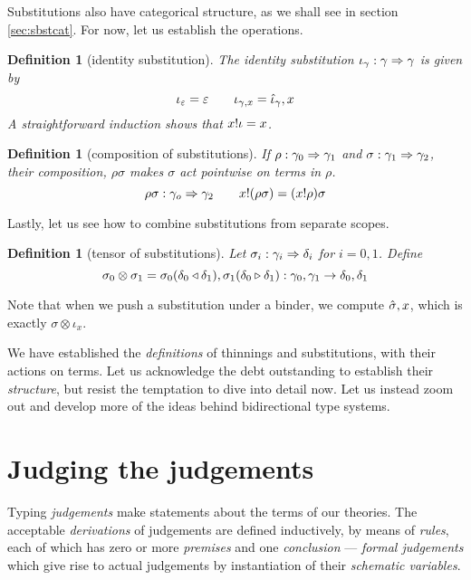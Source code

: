 \documentclass{jfp1}
\newtheorem{definition}[theorem]{Definition}
\newcommand{\emp}{\varepsilon}
\begin{document}
Substitutions also have categorical structure, as we shall see in
section \ref{sec:sbstcat}. For now, let us establish the operations.

\newcommand{\isu}{\iota}
\begin{definition}[identity substitution]
  The identity substitution $\isu_\gamma : \gamma\su\gamma$ is given by
  \[\isu_\emp = \emp \qquad \isu_{\gamma,x} = \wka\isu_\gamma,x
  \]
  A straightforward induction shows that $\sel x\isu = x$.
\end{definition}

\begin{definition}[composition of substitutions]
  If $\rho : \gamma_0\Rightarrow\gamma_1$ and $\sigma : \gamma_1\Rightarrow\gamma_2$, their
  composition, $\rho\sigma$ makes $\sigma$ act \emph{pointwise} on terms in $\rho$.
  \[\rho\sigma : \gamma_o\Rightarrow\gamma_2\qquad x!(\rho\sigma) =
    (x!\rho)\sigma
  \]
\end{definition}

Lastly, let us see how to combine substitutions from separate scopes.

\begin{definition}[tensor of substitutions]
  Let $\sigma_i : \gamma_i\Rightarrow\delta_i$ for $i=0,1$. Define
  \[
    \sigma_0\otimes\sigma_1 =
    \sigma_0(\delta_0 \triangleleft \delta_1),\sigma_1(\delta_0 \triangleright \delta_1)
    : \gamma_0,\gamma_1 \to \delta_0,\delta_1
  \]
\end{definition}

Note that when we push a substitution under a binder, we compute
$\hat\sigma,x$, which is exactly $\sigma\otimes\isu_x$.

We have established the \emph{definitions} of thinnings and
substitutions, with their actions on terms. Let us acknowledge the
debt outstanding to establish their \emph{structure}, but resist the
temptation to dive into detail now. Let us instead zoom out and
develop more of the ideas behind bidirectional type systems.



\section{Judging the judgements}

Typing \emph{judgements} make statements about the terms of our
theories. The acceptable \emph{derivations} of judgements are defined
inductively, by means of \emph{rules}, each of which has zero or
more \emph{premises} and one \emph{conclusion} ---
\emph{formal judgements} which give rise to actual judgements by
instantiation of their \emph{schematic variables}.
\end{document}

